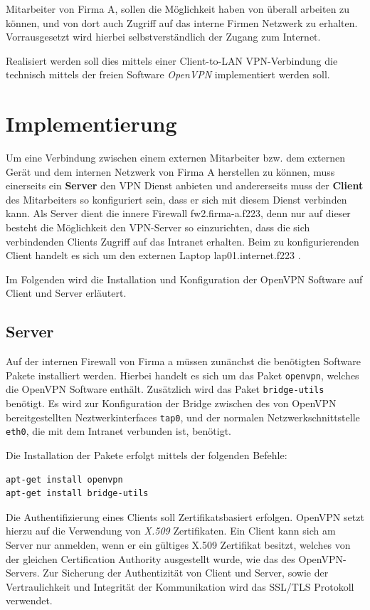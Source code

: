 Mitarbeiter von Firma A, sollen die Möglichkeit haben von überall arbeiten zu können, und von dort auch Zugriff auf das interne Firmen Netzwerk zu erhalten.
Vorrausgesetzt wird hierbei selbstverständlich der Zugang zum Internet.

Realisiert werden soll dies mittels einer Client-to-LAN VPN-Verbindung die technisch mittels der freien Software \emph{OpenVPN} implementiert werden soll.

\section{Implementierung}

Um eine Verbindung zwischen einem externen Mitarbeiter bzw. dem externen Gerät und dem internen Netzwerk von Firma A herstellen zu können, muss einerseits ein \textbf{Server} den VPN Dienst anbieten und andererseits muss der \textbf{Client} des Mitarbeiters so konfiguriert sein, dass er sich mit diesem Dienst verbinden kann.
Als Server dient die innere Firewall fw2.firma-a.f223, denn nur auf dieser besteht die Möglichkeit den VPN-Server so einzurichten, dass die sich verbindenden Clients Zugriff auf das Intranet erhalten.
Beim zu konfigurierenden Client handelt es sich um den externen Laptop lap01.internet.f223 \cite{Neuschwander2014}.

Im Folgenden wird die Installation und Konfiguration der OpenVPN Software auf Client und Server erläutert.


\subsection{Server}\label{vpn:server}

Auf der internen Firewall von Firma a müssen zunänchst die benötigten Software Pakete installiert werden. Hierbei handelt es sich um das Paket \texttt{openvpn}, welches die OpenVPN Software enthält. Zusätzlich wird das Paket \texttt{bridge-utils} benötigt.
Es wird zur Konfiguration der Bridge zwischen des von OpenVPN bereitgestellten Neztwerkinterfaces \texttt{tap0}, und der normalen Netzwerkschnittstelle \texttt{eth0}, die mit dem Intranet verbunden ist, benötigt.

Die Installation der Pakete erfolgt mittels der folgenden Befehle:

\begin{lstlisting}
apt-get install openvpn
apt-get install bridge-utils
\end{lstlisting}

Die Authentifizierung eines Clients soll Zertifikatsbasiert erfolgen. OpenVPN setzt hierzu auf die Verwendung von \emph{X.509} Zertifikaten. Ein Client kann sich am Server nur anmelden, wenn er ein gültiges X.509 Zertifikat besitzt, welches von der gleichen Certification Authority ausgestellt wurde, wie das des OpenVPN-Servers. Zur Sicherung der Authentizität von Client und Server, sowie der Vertraulichkeit und Integrität der Kommunikation wird das SSL/TLS Protokoll verwendet. 

